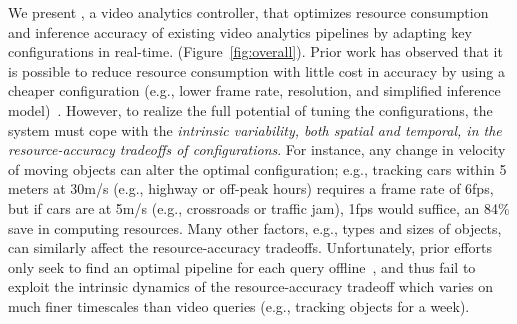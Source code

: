 We present {\em \name}, a video analytics controller, that optimizes 
resource consumption and inference accuracy of existing video 
analytics pipelines by adapting key \nn configurations in real-time.
(Figure~\ref{fig:overall}).
Prior work has observed that it is possible to reduce resource 
consumption with little cost in accuracy by using a cheaper \nn 
configuration (e.g., lower frame rate, resolution, and simplified
inference model)~\cite{videostorm,noscope}.
However, to realize the full potential of tuning the \nn configurations,
the system must cope with the {\em intrinsic variability, both spatial
and temporal, in the resource-accuracy tradeoffs of \nn configurations}.
For instance, any change in velocity of moving objects can alter
the optimal \nn configuration;
e.g., tracking cars within 5 meters at 30m/s (e.g., highway or 
off-peak hours) requires a frame rate of 6fps, but if cars are at 5m/s 
(e.g., crossroads or traffic jam), 1fps would suffice, 
an 84\% save in computing resources.
Many other factors, e.g., types and sizes of objects,
can similarly affect the resource-accuracy tradeoffs.
Unfortunately, prior efforts only seek to find an optimal pipeline for
each query offline~\cite{videostorm,noscope,vigil,mcdnn}, and thus fail
to exploit the intrinsic dynamics of the resource-accuracy tradeoff
which varies on much finer timescales than video queries
(e.g., tracking objects for a week).



